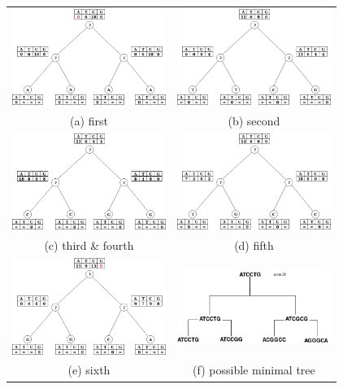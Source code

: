 \documentclass[]{article}
\theoremstyle{definition}
\begin{document}
\begin{figure}[h!]
	\centering
	\begin{tabular}{cc}
			\includegraphics*[width = 50mm]{image/tree_1.png} &   \includegraphics*[width = 50mm]{image/tree_2.png} \\
		(a) first & (b) second \\[6pt]
		\includegraphics*[width = 50mm]{image/tree_3-4.png} &   \includegraphics*[width = 50mm]{image/tree_5.png} \\
		(c) third \& fourth & (d) fifth \\[6pt]
		\includegraphics*[width = 50mm]{image/tree_6.png}&
		\includegraphics*[width = 50mm]{image/final.png}\\
		(e) sixth & (f) possible minimal tree \\[6pt]
	\end{tabular}
\end{figure}
\end{document}
